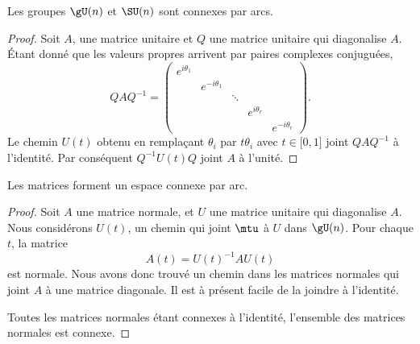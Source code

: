\begin{lemma}
    Les groupes \( \gU(n)\) et \( \SU(n)\) sont connexes par arcs.
\end{lemma}

\begin{proof}
    Soit \( A\), une matrice unitaire et \( Q\) une matrice unitaire qui diagonalise \( A\). Étant donné que les valeurs propres arrivent par paires complexes conjuguées,
    \begin{equation}
        QAQ^{-1}=\begin{pmatrix}
            e^{i\theta_1}    &       &       &       &   \\  
            &    e^{-i\theta_1}    &       &       &   \\  
            &       &    \ddots    &       &   \\  
            &       &       &    e^{i\theta_r}    &   \\  
            &       &       &       &        e^{-i\theta_r}
        \end{pmatrix}.
    \end{equation}
    Le chemin \( U(t)\) obtenu en remplaçant \( \theta_i\) par \( t\theta_i\) avec \( t\in\mathopen[ 0 , 1 \mathclose]\) joint \( QAQ^{-1}\) à l'identité. Par conséquent \( Q^{-1}U(t)Q\) joint \( A\) à l'unité.
\end{proof}

\begin{theorem}
    Les matrices  forment un espace connexe par arc.
\end{theorem}

\begin{proof}
    Soit \( A\) une matrice normale, et \( U\) une matrice unitaire qui diagonalise \( A\). Nous considérons \( U(t)\), un chemin qui joint \( \mtu\) à \( U\) dans \( \gU(n)\). Pour chaque \( t\), la matrice
    \begin{equation}
        A(t)=U(t)^{-1} AU(t)
    \end{equation}
    est normale. Nous avons donc trouvé un chemin dans les matrices normales qui joint \( A\) à une matrice diagonale. Il est à présent facile de la joindre à l'identité.

    Toutes les matrices normales étant connexes à l'identité, l'ensemble des matrices normales est connexe.
\end{proof}


